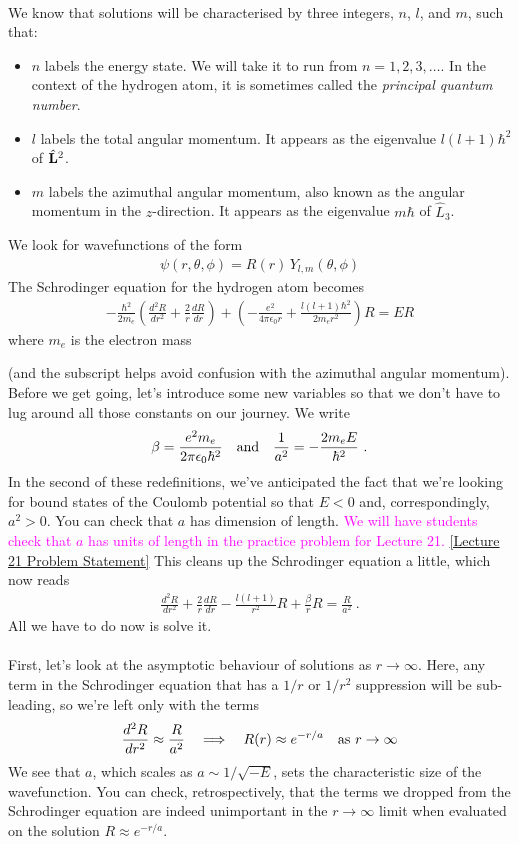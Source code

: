 \documentclass[12pt]{article}
\def\be{\begin{eqnarray}}
\def\ee{\end{eqnarray}}
\newcommand{\nn}{\nonumber}
\newcommand\para{\paragraph{}}
\newcommand{\ra}{\rightarrow}
\newcommand{\co}{\color{olive}}
\newcommand{\alyssa}{\textcolor{magenta}}
\begin{document}
{\para
{\co We know that solutions will be characterised by three integers, $n$, $l$, and $m$, such that:
%
\begin{itemize}
\item $n$ labels the energy state. We will take it to run from $n=1,2,3,\ldots$. In the context of the hydrogen atom, it is sometimes called the {\it principal quantum number}. \vskip 3mm
\item $l$ labels the total angular momentum. It appears as  the eigenvalue $l(l+1)\hbar^2$ of  $\hat{\bf L}^2$. \vskip 3mm
\item $m$ labels the azimuthal angular momentum, also known as the angular momentum in the $z$-direction. It appears as the eigenvalue $m\hbar$ of $\hat{L}_3$.
\end{itemize}
%
We look for wavefunctions of the form
%
\be\psi (r,\theta,\phi) = R(r) \,Y_{l,m}(\theta,\phi)\nn\ee
%
The Schrodinger equation  for the hydrogen atom becomes
%
\be -\frac{\hbar^2}{2m_e}\left(\frac{d^2 R}{dr^2} + \frac{2}{r}\frac{dR}{dr}\right) +\left(-\frac{e^2}{4\pi\epsilon_0r} +\frac{l(l+1)\hbar^2}{2m_er^2}\right)R = ER\nn\ee
%
where $m_e$ is the electron mass} (and the subscript helps avoid confusion with the azimuthal angular momentum). 
Before we get going, let's introduce some new variables so that we don't have to lug around all those constants on our journey. {\co We write
%
\be \beta =\frac{e^2m_e}{2\pi\epsilon_0\hbar^2}\ \ \ {\rm and}\ \ \ \frac{1}{a^2} = -\frac{2m_eE}{\hbar^2}\ .\nn\ee
%
} In the second of these redefinitions, we've anticipated the fact that we're looking for  bound states of the Coulomb potential so that $E<0$ and, correspondingly,  $a^2>0$. {\co You can check that $a$ has dimension of length. \alyssa{We will have students check that $a$ has units of length in the practice problem for Lecture 21.} \href{https://drive.google.com/file/d/1NqP1CT6zZzU0gjhPj_C3M_ct2S-bQVNS/view?usp=drive_link}{[Lecture 21 Problem Statement]} This cleans up the Schrodinger equation a little, which now reads
%
\be  \frac{d^2 R}{dr^2} + \frac{2}{r}\frac{dR}{dr} - \frac{l(l+1)}{r^2} R  +\frac{\beta}{r}R = \frac{R}{a^2}\ . \nn\ee
%
}
All we have to do now is solve it.

\para
{\co First, let's look at the asymptotic behaviour of solutions as  $r\rightarrow \infty$. Here, any term in the Schrodinger equation   that has a $1/r$ or $1/r^2$ suppression will be sub-leading, so we're left only with the terms 
%
\be \frac{d^2R}{dr^2} \approx \frac{R}{a^2}\ \ \ \Longrightarrow\ \ \ R(r) \approx e^{-r/a}\ \ \ {\rm as} \ r\rightarrow \infty\nn\ee
%
}  We see that $a$, which  scales as $a\sim 1/\sqrt{-E}$,    sets the  characteristic size of the wavefunction. You can check, retrospectively, that the terms we dropped from the Schrodinger equation are indeed unimportant in the $r\ra \infty$ limit when evaluated on the solution $R\approx e^{-r/a}$.

}
\end{document}
